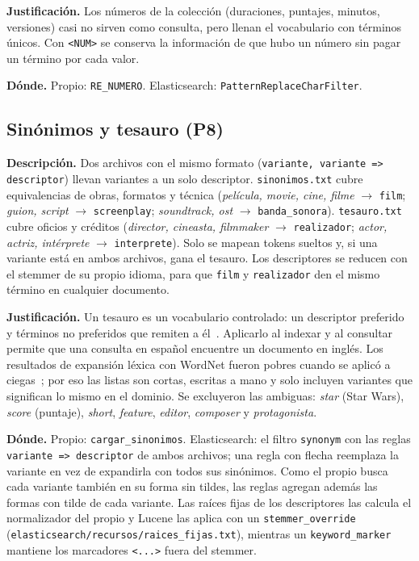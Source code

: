 \documentclass[11pt,spanish]{article}
\begin{document}
\textbf{Justificación.} Los números de la colección (duraciones, puntajes, minutos, versiones) casi no sirven como consulta, pero llenan el vocabulario con términos únicos. Con \texttt{<NUM>} se conserva la información de que hubo un número sin pagar un término por cada valor.

\textbf{Dónde.} Propio: \texttt{RE\_NUMERO}. Elasticsearch: \texttt{PatternReplaceCharFilter}.

\subsection{Sinónimos y tesauro (P8)}
\textbf{Descripción.} Dos archivos con el mismo formato (\texttt{variante, variante => descriptor}) llevan variantes a un solo descriptor. \texttt{sinonimos.txt} cubre equivalencias de obras, formatos y técnica (\textit{película, movie, cine, filme} $\to$ \texttt{film}; \textit{guion, script} $\to$ \texttt{screenplay}; \textit{soundtrack, ost} $\to$ \texttt{banda\_sonora}). \texttt{tesauro.txt} cubre oficios y créditos (\textit{director, cineasta, filmmaker} $\to$ \texttt{realizador}; \textit{actor, actriz, intérprete} $\to$ \texttt{interprete}). Solo se mapean tokens sueltos y, si una variante está en ambos archivos, gana el tesauro. Los descriptores se reducen con el stemmer de su propio idioma, para que \texttt{film} y \texttt{realizador} den el mismo término en cualquier documento.

\textbf{Justificación.} Un tesauro es un vocabulario controlado: un descriptor preferido y términos no preferidos que remiten a él~\cite{iso25964}. Aplicarlo al indexar y al consultar permite que una consulta en español encuentre un documento en inglés. Los resultados de expansión léxica con WordNet fueron pobres cuando se aplicó a ciegas~\cite{voorhees1994}; por eso las listas son cortas, escritas a mano y solo incluyen variantes que significan lo mismo en el dominio. Se excluyeron las ambiguas: \textit{star} (Star Wars), \textit{score} (puntaje), \textit{short}, \textit{feature}, \textit{editor}, \textit{composer} y \textit{protagonista}.

\textbf{Dónde.} Propio: \texttt{cargar\_sinonimos}. Elasticsearch: el filtro \texttt{synonym} con las reglas \texttt{variante => descriptor} de ambos archivos; una regla con flecha reemplaza la variante en vez de expandirla con todos sus sinónimos. Como el propio busca cada variante también en su forma sin tildes, las reglas agregan además las formas con tilde de cada variante. Las raíces fijas de los descriptores las calcula el normalizador del propio y Lucene las aplica con un \texttt{stemmer\_override} (\texttt{elasticsearch/recursos/raices\_fijas.txt}), mientras un \texttt{keyword\_marker} mantiene los marcadores \texttt{<...>} fuera del stemmer.
\end{document}
